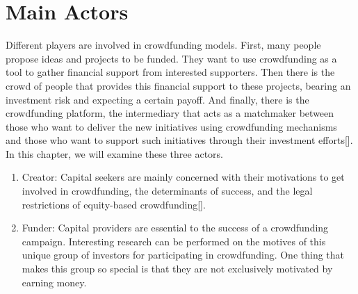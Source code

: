 \section*{ Main Actors }
Different players are involved in crowdfunding models. First, many people propose ideas and
projects to be funded. They want to use crowdfunding as a tool to gather financial support from interested supporters.
Then there is the crowd of people that provides this financial support to these projects, bearing an investment
risk and expecting a certain payoff. And finally, there is the crowdfunding platform, the intermediary that acts
as a matchmaker between those who want to deliver the new initiatives using crowdfunding mechanisms
and those who want to support such initiatives through their investment efforts[\cite{10.1108/09564231111155079}]. In this chapter, we will
examine these three actors.

\begin{enumerate}
      \item Creator:
            Capital seekers are mainly concerned with their motivations to get involved in crowdfunding, the determinants of success, and the legal restrictions of equity-based crowdfunding[\cite{10.1007/978-3-319-18017-5_3}].

      \item Funder:
            Capital providers are essential to the success of a crowdfunding campaign. Interesting research can be performed on the motives of this unique group of investors for participating in crowdfunding. One thing that
            makes this group so special is that they are not exclusively motivated by earning money.

\end{enumerate}